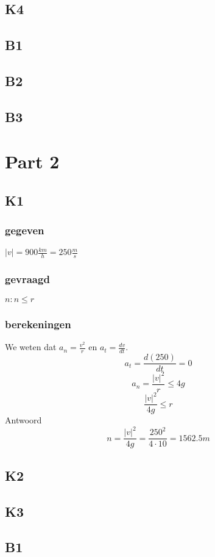 \documentclass[10pt,a4paper]{article}
\begin{document}
\subsection{K4}

\subsection{B1}

\subsection{B2}

\subsection{B3}

\section{Part 2}
\subsection{K1}
\subsubsection*{gegeven}
$|v|= 900\frac{km}{h} = 250\frac{m}{s}$
\subsubsection*{gevraagd}
$n: n \le r$
\subsubsection*{berekeningen}
We weten dat $a_n=\frac{v^2}{r}$ en  $a_t = \frac{dv}{dt}$.
\[
a_t=\frac{d(250)}{dt} = 0
\]
\[
a_n = \frac{|v|^2}{r} \le 4g
\]
\[
\frac{|v|^2}{4g}\le r
\]
Antwoord
\[
n= \frac{|v|^2}{4g} = \frac{250^2}{4 \cdot 10} = 1562.5m
\]

\subsection{K2}

\subsection{K3}

\subsection{B1}
\end{document}
